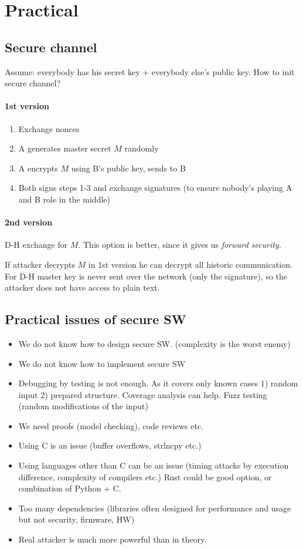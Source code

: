 \section{\texorpdfstring{Practical}{Practical}}
\vspace{5mm}
\large

\subsection{Secure channel}
Assume: everybody has his secret key + everybody else's public key. How to init secure channel?

\paragraph{1st version}
\begin{enumerate}
	\item Exchange nonces
	\item A generates master secret $M$ randomly
	\item A encrypts $M$ using B's public key, sends to B
	\item Both signs steps 1-3 and exchange signatures (to ensure nobody's playing A and B role in the middle)
\end{enumerate}

\paragraph{2nd version}
D-H exchange for $M$. This option is better, since it gives us \emph{forward security}.

If attacker decrypts $M$ in 1st version he can decrypt all historic communication.
For D-H master key is never sent over the network (only the signature), so the attacker does not have access to plain text.

\subsection{Practical issues of secure SW}
\begin{itemize}
	\item We do not know how to design secure SW. (complexity is the worst enemy)
	\item We do not know how to implement secure SW
	\item Debugging by testing is not enough. As it covers only known cases 1) random input 2) prepared structure.
		Coverage analysis can help. Fuzz testing (random modifications of the input)
	\item We need proofs (model checking), code reviews etc.
	\item Using C is an issue (buffer overflows, strlncpy etc.)
	\item Using languages other than C can be an issue (timing attacks by execution difference, complexity of compilers etc.)
		Rust could be good option, or combination of Python + C.
	\item Too many dependencies (libraries often designed for performance and usage but not security, firmware, HW)
	\item Real attacker is much more powerful than in theory.
\end{itemize}

